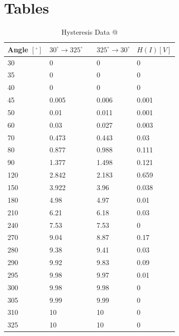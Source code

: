 \documentclass[a4,11pt]{article}
\makeatletter
\newcommand*{\rom}[1]{\expandafter\@slowromancap\romannumeral #1@}
\makeatother
\begin{document}
\section{Tables}
\begin{table}[H]
	\centering
	\caption{Hysteresis Data \rom{1}}
	\label{hyst1}
	\begin{tabular}{l|l|l||l}
		Angle $[^{\circ}]$  &  $30^{\circ}\rightarrow325^{\circ}$  \
		&  $325^{\circ}\rightarrow30^{\circ}$  &  $H(I) [V]$  \\
		\hline
		30  &  0  &  0  &  0  \\
		35  &  0  &  0  &  0  \\
		40  &  0  &  0  &  0  \\
		45  &  0.005  &  0.006  &  0.001  \\
		50  &  0.01  &  0.011  &  0.001  \\
		60  &  0.03  &  0.027  &  0.003  \\
		70  &  0.473  &  0.443  &  0.03  \\
		80  &  0.877  &  0.988  &  0.111  \\
		90  &  1.377  &  1.498  &  0.121  \\
		120  &  2.842  &  2.183  &  0.659  \\
		150  &  3.922  &  3.96  &  0.038  \\
		180  &  4.98  &  4.97  &  0.01  \\
		210  &  6.21  &  6.18  &  0.03  \\
		240  &  7.53  &  7.53  &  0  \\
		270  &  9.04  &  8.87  &  0.17  \\
		280  &  9.38  &  9.41  &  0.03  \\
		290  &  9.92  &  9.83  &  0.09  \\
		295  &  9.98  &  9.97  &  0.01  \\
		300  &  9.98  &  9.98  &  0  \\
		305  &  9.99  &  9.99  &  0  \\
		310  &  10  &  10  &  0  \\
		325  &  10  &  10  &  0  \\
	\end{tabular}
\end{table}
\end{document}
